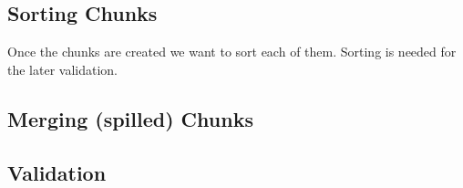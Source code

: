 \subsection{Sorting Chunks}
Once the chunks are created we want to sort each of them. Sorting is needed for the later validation.

\subsection{Merging (spilled) Chunks}

\subsection{Validation}